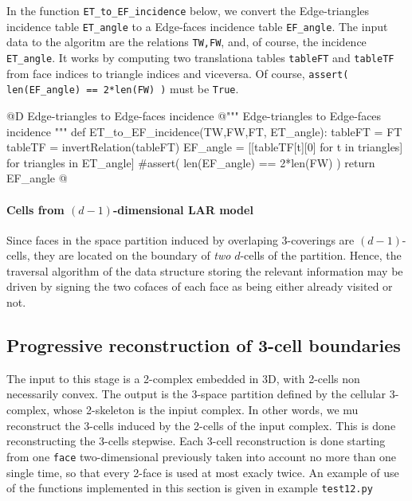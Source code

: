 \documentclass[11pt,oneside]{article}    %
\begin{document}
In the function \texttt{ET\_to\_EF\_incidence} below, we convert the Edge-triangles incidence table \texttt{ET\_angle} to a Edge-faces incidence table \texttt{EF\_angle}. The input data to the algoritm are the relations \texttt{TW,FW}, and, of course, the incidence \texttt{ET\_angle}. It works by computing two translationa tables \texttt{tableFT} and \texttt{tableTF} from face indices to triangle indices and viceversa. Of course, \texttt{assert( len(EF\_angle) == 2*len(FW) )} must be \texttt{True}.

@D Edge-triangles to Edge-faces incidence
@{""" Edge-triangles to Edge-faces incidence """
def ET_to_EF_incidence(TW,FW,FT, ET_angle):
    tableFT = FT
    tableTF = invertRelation(tableFT)
    EF_angle = [[tableTF[t][0] for t in triangles] for triangles in ET_angle]
    #assert( len(EF_angle) == 2*len(FW) )
    return EF_angle
@}


\paragraph{Cells from $(d-1)$-dimensional LAR model}
Since faces in the space partition induced by overlaping 3-coverings are $(d-1)$-cells, they are located on the boundary of \emph{two} $d$-cells of the partition. Hence, the traversal algorithm of the data structure storing the relevant information may be driven by signing the two cofaces of each face as being either already visited or not.


\subsection{Progressive reconstruction of 3-cell boundaries}

The input to this stage is a 2-complex embedded in 3D, with 2-cells non necessarily convex. The output is the 3-space partition defined by the cellular 3-complex, whose 2-skeleton is the inpiut complex. In other words, we mu reconstruct the 3-cells induced by the 2-cells of the input complex. This is done reconstructing the 3-cells stepwise. Each 3-cell reconstruction is done starting from one \texttt{face} two-dimensional previously taken into account no more than one single time, so that every 2-face is used at most exacly twice. An example of use of the functions implemented in this section is given in example \texttt{test12.py}
\end{document}
